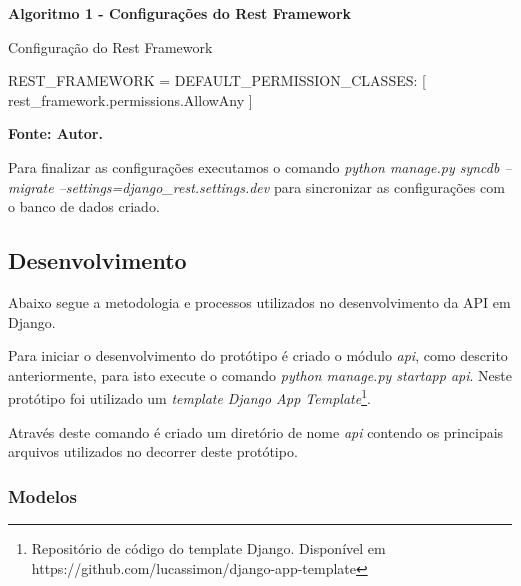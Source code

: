  \begin{center}	
    \textbf{Algoritmo 1 -  Configurações do Rest Framework}
    \vspace{-0.3cm}
    \begin{minipage}[ht]{13cm}
      \begin{algorithm}[H]
      \footnotesize
      \caption{Configuração do Rest Framework}
      \label{alg:conf_rest_framework}
	\begin{algorithmic}[1]
	  \STATE REST\_FRAMEWORK = { DEFAULT\_PERMISSION\_CLASSES: [ rest\_framework.permissions.AllowAny ] }
	\end{algorithmic}
      \end{algorithm}

      \small \centering \textbf{\footnotesize Fonte: Autor.}
    \end{minipage}
  \end{center}
  
  Para finalizar as configurações executamos o comando \textit{python manage.py syncdb --migrate --settings=django\_rest.settings.dev}
  para sincronizar as configurações com o banco de dados criado.
  
\subsection{Desenvolvimento}

  Abaixo segue a metodologia e processos utilizados no desenvolvimento da API em Django.
  
  Para iniciar o desenvolvimento do protótipo é criado o módulo \textit{api}, como descrito anteriormente,
  para isto execute o comando \textit{python manage.py startapp api}. Neste protótipo foi utilizado um \textit{template}
  \textit{Django App Template}\footnote[12]{Repositório de código do template Django. Disponível em https://github.com/lucassimon/django-app-template}.
  
  Através deste comando é criado um diretório de nome \textit{api} contendo os principais arquivos utilizados no decorrer deste protótipo.

\subsubsection{Modelos}


